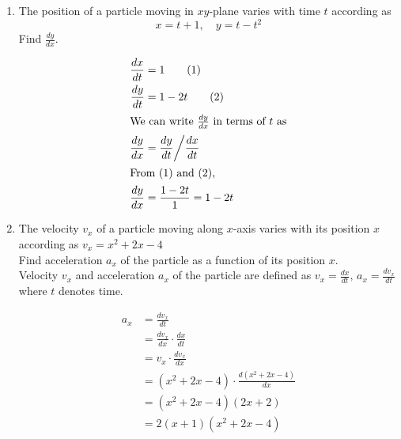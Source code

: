 \begin{enumerate}
    \item The position of a particle moving in \( xy \)-plane varies with time \( t \) according as \[ x = t + 1, \quad y = t - t^2 \] Find \(\frac{dy}{dx}\).
    \begin{solution}
        \begin{align*}
            \frac{dx}{dt} &= 1 \tag{1}\\
            \frac{dy}{dt} &= 1 - 2t \tag{2}\\
            \intertext{We can write \(\frac{dy}{dx}\) in terms of $t$ as}
            \frac{dy}{dx} &= \frac{dy}{dt} \bigg/ \frac{dx}{dt} \\
            \intertext{From (1) and (2),}
            \frac{dy}{dx} &= \frac{1 - 2t}{1} = 1 - 2t
        \end{align*}
    \end{solution}
    \BgThispage
    \item The velocity \( v_x \) of a particle moving along \( x \)-axis varies with its position \( x \) according as \( v_x = x^2 + 2x - 4 \) \\
    Find acceleration \( a_x \) of the particle as a function of its position \( x \). \\
    Velocity \( v_x \) and acceleration \( a_x \) of the particle are defined as \( v_x = \frac{dx}{dt}, \, a_x = \frac{dv_x}{dt} \) where \( t \) denotes time.
    \begin{solution}
        \begin{align*}
            a_x &= \frac{dv_x}{dt} \\
            &=\frac{dv_x}{dx} \cdot \frac{dx}{dt} \\
            &= v_x \cdot \frac{dv_x}{dx} \\
            &= (x^2 + 2x - 4) \cdot \frac{d (x^2 + 2x - 4)}{dx} \\
            &= (x^2 + 2x - 4)(2x + 2) \\
            &= 2 (x + 1) (x^2 + 2x - 4)
        \end{align*}
    \end{solution}


\end{enumerate}


